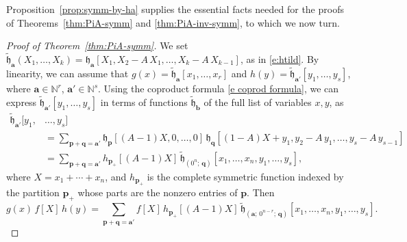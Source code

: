 \documentclass[12pt]{amsart}
\theoremstyle{definition}
\theoremstyle{remark}
\newcommand{\NN}{{\mathbb N}}
\newcommand{\aA}{{\mathbf a}}
\newcommand{\bb}{{\mathbf b}}
\newcommand{\pp}{{\mathbf p}}
\newcommand{\qq}{{\mathbf q}}
\newcommand{\fh}{{\mathfrak h}}
\newcommand{\tfh}{{\widetilde{\mathfrak h}}}
\begin{document}
Proposition~\ref{prop:symm-by-ha} supplies the essential facts needed
for the proofs of Theorems~\ref{thm:PiA-symm} and
\ref{thm:PiA-inv-symm}, to which we now turn.

\begin{proof}[Proof of Theorem~\ref{thm:PiA-symm}] We set $\tfh _{\aA
}(X_{1},\ldots,X_{k}) = \fh_{\aA }[X_{1}, X_{2} - A\, X_{1}, \ldots,
X_{k} - A\, X_{k-1}]$, as in \eqref{e:htild}.  By linearity, we can
assume that $g(x) = \tfh _{\aA }[x_{1}, \ldots, x_{r}]$ and $h(y) =
\tfh _{\aA '}[y_{1}, \ldots, y_{s}]$, where $\aA \in \NN ^{r}$, $\aA
'\in \NN ^{s}$.  Using the coproduct formula \eqref{e coprod formula},
we can express $\tfh _{\aA '}[y_{1}, \ldots, y_{s}] $ in terms of
functions $\tfh _{\bb }$ of the full list of variables $x, y$, as
\begin{equation}\label{e:hy-A-extended}
\begin{aligned}
\tfh _{\aA '}[y_{1},& \ldots, y_{s}] \\
& = \sum _{\pp +\qq =\aA '} \fh_{\pp }[(A-1)X,0,\ldots,0]\, \fh_{\qq
}[(1-A)X + y_{1}, y_{2} - A\, y_{1}, \ldots, y_{s} - A\, y_{s-1}]\\
& = \sum _{\pp +\qq =\aA '} h_{\pp _{+}}[(A-1)X]\, \tfh
_{(0^{n};\, \qq) }[x_{1}, \ldots, x_{n}, y_{1}, \ldots, y_{s}],
\end{aligned}
\end{equation}
where $X = x_{1}+\cdots +x_{n}$, and $h_{\pp _{+}}$ is the complete
symmetric function indexed by the partition $\pp _{+}$ whose parts are
the nonzero entries of $\pp $.  Then
\begin{equation}\label{e:fgh-by-ha}
g(x)\, f[X]\, h(y) = \sum _{\pp +\qq =\aA '} f[X]\,
h_{\pp _{+}}[(A-1)X]\, \tfh_{(\aA ;\, 0^{n-r};\, \qq) }[x_{1},
\ldots, x_{n}, y_{1}, \ldots, y_{s}].
\end{equation}


\end{proof}
\end{document}
